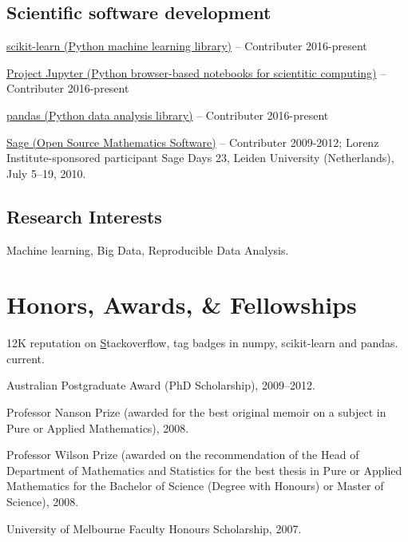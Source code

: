 \documentclass[10pt,a4paper]{article}
\renewenvironment{itemize}{
  \begin{list}{}{
    \setlength{\leftmargin}{1.5em}
    \setlength{\itemsep}{0.25em}
    \setlength{\parskip}{0pt}
    \setlength{\parsep}{0.25em}
  }
}{
  \end{list}
}
\begin{document}
 \subsection*{Scientific software development}
 \begin{itemize}
 \item \href{http://scikit-learn.org}{scikit-learn (Python machine learning library)} --
   Contributer 2016-present
 \item \href{http://jupyter.org}{Project Jupyter (Python browser-based notebooks for scientitic computing)} --
   Contributer 2016-present
 \item \href{http://pandas.pydata.org}{pandas (Python data analysis library)} --
   Contributer 2016-present
 \item \href{http://sage.org}{Sage (Open Source Mathematics Software)} --
   Contributer 2009-2012; Lorenz Institute-sponsored participant Sage Days 23, Leiden University (Netherlands), July 5--19, 2010.
 \end{itemize}



\subsection*{Research Interests}
\begin{itemize}
\item Machine learning, Big Data, Reproducible Data Analysis.
\end{itemize}

\section*{Honors, Awards, \& Fellowships}

\begin{itemize}
\item 12K reputation on \href{http://stackoverflow.com/users/839957/maxymoo?tab=profile}Stackoverflow, tag badges in numpy, scikit-learn and pandas. current.
\item Australian Postgraduate Award (PhD Scholarship), 2009--2012.
\item Professor Nanson Prize (awarded for the best original memoir on a subject in Pure or Applied Mathematics), 2008.
\item Professor Wilson Prize (awarded on the recommendation of the Head of Department of Mathematics and Statistics for the best thesis in Pure or Applied Mathematics for the Bachelor of Science (Degree with Honours) or Master of Science), 2008.
\item University of Melbourne Faculty Honours Scholarship, 2007.
\end{itemize}
\end{document}
